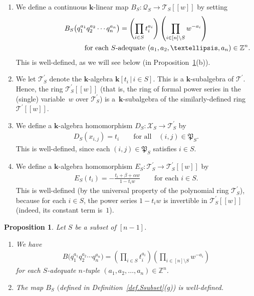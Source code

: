 \documentclass[11pt]{article}
\newtheorem{Proposition}[Theorem]{Proposition}
\numberwithin{equation}{section}
\let\prodnonlimits\prod
\renewcommand{\prod}{\prodnonlimits\limits}
\begin{document}
\begin{Definition}
\begin{enumerate}
\item[(g)] We define a continuous $\mathbf{k}$-linear map $B_{S}\colon \mathcal{Q}_{S}\rightarrow\mathcal{T}_{S}[[w]] $ by setting
\begin{gather*}
B_{S}\big( q_{1}^{a_{1}}q_{2}^{a_{2}}\cdots q_{n}^{a_{n}}\big) =\left( \prod_{i\in S}t_{i}^{a_{i}}\right) \left( \prod_{i\in[n] \setminus S}w^{-a_{i}}\right) \\
\hphantom{B_{S}\big( q_{1}^{a_{1}}q_{2}^{a_{2}}\cdots q_{n}^{a_{n}}\big) =}{} \text{for each }S\text{-adequate } ( a_{1},a_{2},\ldots,a_{n}) \in\mathbb{Z}^{n}.
\end{gather*}
This is well-defined, as we will see below (in Proposition~\ref{prop.pathless.BSwd}(b)).
\item[(h)] We let $\mathcal{T}_{S}^{\prime}$ denote the $\mathbf{k}$-algebra $\mathbf{k} [ t_{i}\,|\, i\in S ] $. This is a $\mathbf{k}$-subalgebra of $\mathcal{T}^{\prime}$. Hence, the ring $\mathcal{T}_{S}^{\prime}[[w]] $ (that is, the ring of formal power series in the (single) variable~$w$ over $\mathcal{T}_{S}^{\prime}$) is a~$\mathbf{k}$-subalgebra of the similarly-defined ring~$\mathcal{T}^{\prime}[[w]] $.
\item[(i)] We define a $\mathbf{k}$-algebra homomorphism $D_{S}\colon \mathcal{X}_{S}\rightarrow\mathcal{T}_{S}^{\prime}$ by
\begin{gather*}
D_{S}(x_{i,j}) =t_{i}\qquad \text{for all} \quad (i,j) \in\mathfrak{P}_{S}.
\end{gather*}
This is well-defined, since each $(i,j) \in\mathfrak{P}_{S}$ satisfies $i\in S$.
\item[(j)] We define a $\mathbf{k}$-algebra homomorphism $E_{S}\colon \mathcal{T}_{S}^{\prime}\rightarrow\mathcal{T}_{S}^{\prime} [ [w]] $ by
\begin{gather*}
E_{S}(t_{i}) =-\frac{t_{i}+\beta+\alpha w}{1-t_{i}w}\qquad \text{for each }i\in S.
\end{gather*}
This is well-defined (by the universal property of the polynomial ring $\mathcal{T}_{S}^{\prime}$), because for each $i\in S$, the power series $1-t_{i}w$ is invertible in $\mathcal{T}_{S}^{\prime} [ [w]] $ (indeed, its constant term is~$1$).
\end{enumerate}
\end{Definition}

\begin{Proposition}\label{prop.pathless.BSwd}Let $S$ be a subset of $[n-1] $.
\begin{enumerate}\itemsep=0pt
\item[{\rm (a)}] We have
\begin{gather}
B\big( q_{1}^{a_{1}}q_{2}^{a_{2}}\cdots q_{n}^{a_{n}}\big) =\left(\prod_{i\in S}t_{i}^{a_{i}}\right) \left( \prod_{i\in[n]\setminus S}w^{-a_{i}}\right) \label{eq.prop.pathless.BSwd.a.eq}
\end{gather}
for each $S$-adequate $n$-tuple $ ( a_{1},a_{2},\ldots,a_{n} ) \in\mathbb{Z}^{n}$.

\item[{\rm (b)}] The map $B_{S}$ $($defined in Definition~{\rm \ref{def.Ssubset}(g))} is well-defined.
\end{enumerate}
\end{Proposition}
\end{document}
